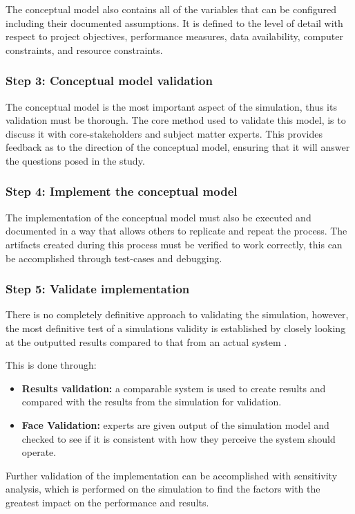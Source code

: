 The conceptual model also contains all of the variables that can be configured including their documented assumptions. 
It is defined to the level of detail with respect to project objectives, performance measures, data availability, computer constraints, and resource constraints.

\subsubsection{Step 3: Conceptual model validation}
The conceptual model is the most important aspect of the simulation, thus its validation must be thorough.
The core method used to validate this model, is to discuss it with core-stakeholders and subject matter experts.
This provides feedback as to the direction of the conceptual model, ensuring that it will answer the questions posed in the study.

\subsubsection{Step 4: Implement the conceptual model}
The implementation of the conceptual model must also be executed and documented in a way that allows others to replicate and repeat the process.
The artifacts created during this process must be verified to work correctly, this can be accomplished through test-cases and debugging.

\subsubsection{Step 5: Validate implementation}
There is no completely definitive approach to validating the simulation,
however, the most definitive test of a simulations validity is established by closely looking at the outputted results compared to that from an actual system \cite{Law2005}.

This is done through:
\begin{itemize}
  \item \textbf{Results validation: } a comparable system is used to create results and compared with the results from the simulation for validation.
  \item \textbf{Face Validation: } experts are given output of the simulation model and checked to see if it is consistent with how they perceive the system should operate.
\end{itemize}

Further validation of the implementation can be accomplished with sensitivity analysis,
which is performed on the simulation to find the factors with the greatest impact on the performance and results.

